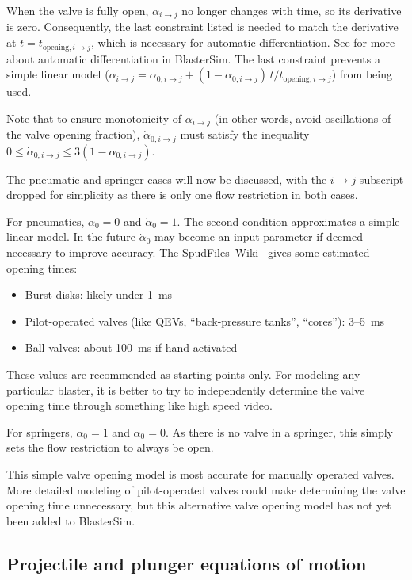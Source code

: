 When the valve is fully open, $\alpha_{i \rightarrow j}$ no longer changes with time, so its derivative is zero.
Consequently, the last constraint listed is needed to match the derivative at $t = t_{\text{opening},i \rightarrow j}$, which is necessary for automatic differentiation.
See  for more about automatic differentiation in BlasterSim.
The last constraint prevents a simple linear model ($\alpha_{i \rightarrow j} = \alpha_{0,i \rightarrow j} + (1 - \alpha_{0,i \rightarrow j})\,t/t_{\text{opening},i \rightarrow j}$) from being used.

Note that to ensure monotonicity of $\alpha_{i \rightarrow j}$ (in other words, avoid oscillations of the valve opening fraction), $\dot{\alpha}_{0,i \rightarrow j}$ must satisfy the inequality $0 \leq \dot{\alpha}_{0,i \rightarrow j} \leq 3 (1 - \alpha_{0,i \rightarrow j})$. %

The pneumatic and springer cases will now be discussed, with the $i \rightarrow j$ subscript dropped for simplicity as there is only one flow restriction in both cases.

For pneumatics, $\alpha_0 = 0$ and $\dot{\alpha}_0 = 1$.
The second condition approximates a simple linear model.
In the future $\dot{\alpha}_0$ may become an input parameter if deemed necessary to improve accuracy.
The SpudFiles~Wiki~\cite{noauthor_opening_2008} gives some estimated opening times:
\begin{itemize}
\item Burst disks: likely under 1~ms
\item Pilot-operated valves (like QEVs, ``back-pressure tanks'', ``cores''): 3--5~ms
\item Ball valves: about 100~ms if hand activated
\end{itemize}
These values are recommended as starting points only.
For modeling any particular blaster, it is better to try to independently determine the valve opening time through something like high speed video.

For springers, $\alpha_0 = 1$ and $\dot{\alpha}_0 = 0$.
As there is no valve in a springer, this simply sets the flow restriction to always be open.

This simple valve opening model is most accurate for manually operated valves.
More detailed modeling of pilot-operated valves could make determining the valve opening time unnecessary, but this alternative valve opening model has not yet been added to BlasterSim.

\subsection{Projectile and plunger equations of motion}\label{equations-of-motion}

